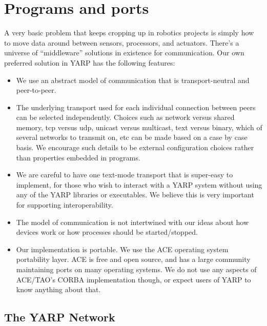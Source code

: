 
\section{Programs and ports}

A very basic problem that keeps cropping up in robotics projects is
simply how to move data around between sensors, processors,
and actuators.  There's a universe of ``middleware'' solutions
in existence for communication.  Our own preferred solution
in YARP has the following features:

\begin{itemize}

\item We use an abstract model of communication that is
transport-neutral and peer-to-peer.

\item The underlying transport used for each individual connection
between peers can be selected independently.  Choices such as network
versus shared memory, tcp versus udp, unicast versus multicast, text
versus binary, which of several networks to transmit on, etc can be
made based on a case by case basis.  We encourage such details to be
external configuration choices rather than properties embedded in
programs.

\item We are careful to have one text-mode transport that is
super-easy to implement, for those who wish to interact with a YARP
system without using any of the YARP libraries or executables.  We
believe this is very important for supporting interoperability.

\item The model of communication is not intertwined with our
ideas about how devices work or how processes should be started/stopped.

\item Our implementation is portable.  We use the ACE operating system
portability layer.  ACE is free and open source, and has a large
community maintaining ports on many operating systems.  We do not use
any aspects of ACE/TAO's CORBA implementation though, or expect users
of YARP to know anything about that.

\end{itemize}







\subsection{The YARP Network}


